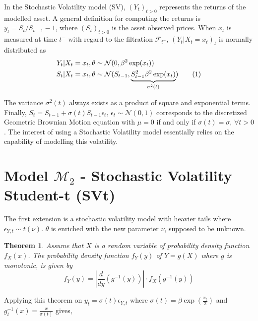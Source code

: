 \documentclass[11pt,a4,twosided,singlespacing,titlepagenumber=on]{scrreprt}
\numberwithin{equation}{chapter} %
\newtheorem{theorem}{Theorem}%
\theoremstyle{remark}
\newcommand\numberthis{\addtocounter{equation}{1}\tag{\theequation}}
\begin{document}
In the Stochastic Volatility model (SV), $(Y_t)_{t>0}$ represents the returns of the modelled asset. A general definition for computing the returns is $y_t = S_t / S_{t-1} - 1$, where $(S_t)_{t>0}$ is the asset observed prices. When $x_t$ is measured at time $t^-$ with regard to the filtration $\mathcal{F}_{t^-}$, $(Y_t|X_t = x_t)_t$ is normally distributed as
\begin{align*}
Y_t | X_t = x_t, \theta 					&\sim \mathcal{N}(0, \beta^2 \exp(x_t)) \\
S_t | X_t = x_t, \theta 					&\sim \mathcal{N}(S_{t-1}, \underbrace{S_{t-1}^2 \beta^2 \exp(x_t)}_{\sigma^2(t)}) \numberthis \label{cond_dist_sv_model}
\end{align*}


 The variance $\sigma^2(t)$ always exists as a product of square and exponential terms. Finally, $S_t = S_{t-1} + \sigma(t) S_{t-1} \epsilon_t \text{, } \epsilon_t \sim \mathcal{N}(0,1)$ corresponds to the discretized Geometric Brownian Motion equation with $\mu = 0$ if and only if $\sigma(t) = \sigma \text{, } \forall t > 0$. The interest of using a Stochastic Volatility model essentially relies on the capability of modelling this volatility.

\section{Model $\mathcal{M}_2$ - Stochastic Volatility Student-t (SVt)}
The first extension is a stochastic volatility model with heavier tails where $\epsilon_{Y,t} \sim t(\nu)$. $\theta$ is enriched with the new parameter $\nu$, supposed to be unknown.

\begin{theorem}
\textit{
Assume that $X$ is a random variable of probability density function $f_X(x)$. The probability density function $f_Y(y)$ of $Y=g(X)$ where $g$ is monotonic, is given by
}
\begin{equation}
f_Y(y) = \left|\frac{d}{dy}(g^{-1}(y))\right| \cdot f_X(g^{-1}(y))
\end{equation}
\end{theorem}


Applying this theorem on $y_t = \sigma(t) \epsilon_{Y,t}$ where $\sigma(t) = \beta \exp \left(\frac{x_t}{2} \right)$ and $g^{-1}_t(x) = \frac{x}{\sigma(t)}$ gives,
\end{document}
